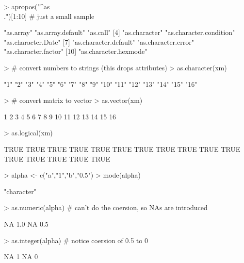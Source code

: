 \begin{Schunk}
\begin{Sinput}
> apropos("^as\\.")[1:10]      # just a small sample
\end{Sinput}
\begin{Soutput}
 [1] "as.array"               "as.array.default"       "as.call"               
 [4] "as.character"           "as.character.condition" "as.character.Date"     
 [7] "as.character.default"   "as.character.error"     "as.character.factor"   
[10] "as.character.hexmode"  
\end{Soutput}
\begin{Sinput}
> # convert numbers to strings (this drops attributes)
> as.character(xm)             
\end{Sinput}
\begin{Soutput}
 [1] "1"  "2"  "3"  "4"  "5"  "6"  "7"  "8"  "9"  "10" "11" "12" "13" "14" "15" "16"
\end{Soutput}
\begin{Sinput}
> # convert matrix to vector
> as.vector(xm)
\end{Sinput}
\begin{Soutput}
 [1]  1  2  3  4  5  6  7  8  9 10 11 12 13 14 15 16
\end{Soutput}
\begin{Sinput}
> as.logical(xm)
\end{Sinput}
\begin{Soutput}
 [1] TRUE TRUE TRUE TRUE TRUE TRUE TRUE TRUE TRUE TRUE TRUE TRUE TRUE TRUE TRUE TRUE
\end{Soutput}
\begin{Sinput}
> alpha <- c("a","1","b","0.5")    
> mode(alpha)
\end{Sinput}
\begin{Soutput}
[1] "character"
\end{Soutput}
\begin{Sinput}
> as.numeric(alpha)      # can't do the coersion, so NAs are introduced
\end{Sinput}
\begin{Soutput}
[1]  NA 1.0  NA 0.5
\end{Soutput}
\begin{Sinput}
> as.integer(alpha)      # notice coersion of 0.5 to 0
\end{Sinput}
\begin{Soutput}
[1] NA  1 NA  0
\end{Soutput}
\end{Schunk}


